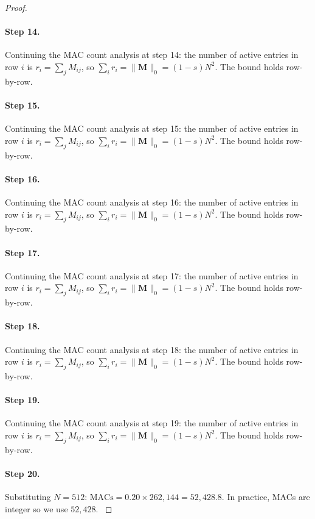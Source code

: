 \begin{proof}
\paragraph{Step 14.}
Continuing the MAC count analysis at step 14:
the number of active entries in row $i$ is $r_i = \sum_j M_{ij}$, so
$\sum_i r_i = \|\mathbf{M}\|_0 = (1-s)N^2$.  The bound holds row-by-row.

\paragraph{Step 15.}
Continuing the MAC count analysis at step 15:
the number of active entries in row $i$ is $r_i = \sum_j M_{ij}$, so
$\sum_i r_i = \|\mathbf{M}\|_0 = (1-s)N^2$.  The bound holds row-by-row.

\paragraph{Step 16.}
Continuing the MAC count analysis at step 16:
the number of active entries in row $i$ is $r_i = \sum_j M_{ij}$, so
$\sum_i r_i = \|\mathbf{M}\|_0 = (1-s)N^2$.  The bound holds row-by-row.

\paragraph{Step 17.}
Continuing the MAC count analysis at step 17:
the number of active entries in row $i$ is $r_i = \sum_j M_{ij}$, so
$\sum_i r_i = \|\mathbf{M}\|_0 = (1-s)N^2$.  The bound holds row-by-row.

\paragraph{Step 18.}
Continuing the MAC count analysis at step 18:
the number of active entries in row $i$ is $r_i = \sum_j M_{ij}$, so
$\sum_i r_i = \|\mathbf{M}\|_0 = (1-s)N^2$.  The bound holds row-by-row.

\paragraph{Step 19.}
Continuing the MAC count analysis at step 19:
the number of active entries in row $i$ is $r_i = \sum_j M_{ij}$, so
$\sum_i r_i = \|\mathbf{M}\|_0 = (1-s)N^2$.  The bound holds row-by-row.

\paragraph{Step 20.}
Substituting $N = 512$:
$\mathrm{MACs} = 0.20 \times 262{,}144 = 52{,}428.8$.
In practice, MACs are integer so we use $52{,}428$.
\cite{frankle2019lottery}


\end{proof}
